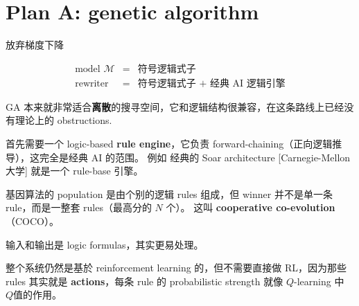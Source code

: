 \documentclass[12pt, orivec]{article}
\begin{document}
\section{Plan A: genetic algorithm}
\label{COCO}

\begin{tcolorbox}[ams equation, colback=yellow, colframe=white]
\mbox{放弃梯度下降}
\end{tcolorbox}
\begin{eqnarray}
\mbox{model } \mathcal{M} &=& \mbox{符号逻辑式子} \nonumber \\
\mbox{rewriter} &=& \mbox{符号逻辑式子 + 经典 AI 逻辑引擎}
\end{eqnarray}

GA 本来就非常适合\textbf{离散}的搜寻空间，它和逻辑结构很兼容，在这条路线上已经没有理论上的 obstructions. 



首先需要一个 logic-based \textbf{rule engine}，它负责 forward-chaining（正向逻辑推导），这完全是经典 AI 的范围。 例如 经典的 Soar architecture [Carnegie-Mellon 大学] 就是一个 rule-base 引擎。 %


基因算法的 population 是由个别的逻辑 rules 组成，但 winner 并不是单一条 rule，而是一整套 rules（最高分的 $N$ 个）。 这叫 \textbf{cooperative co-evolution}（COCO）。  

输入和输出是 logic formulas，其实更易处理。 

整个系统仍然是基於 reinforcement learning 的，但不需要直接做 RL，因为那些 rules 其实就是 \textbf{actions}，每条 rule  的 probabilistic strength 就像 $Q$-learning 中 $Q$值的作用。 
\end{document}
